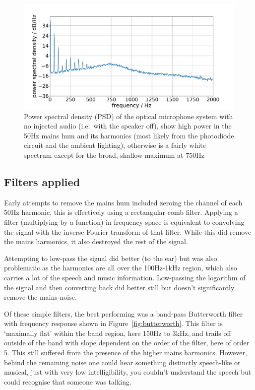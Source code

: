 \documentclass[prb,preprint]{revtex4-1}
\begin{document}
\begin{figure}%
	\includegraphics[width=\textwidth]{figures/podo_noise_psd_zoom-cropped.pdf}
	\caption{Power spectral density (PSD) of the optical microphone system with no injected audio (i.e.\ with the speaker off), show high power in the 50Hz mains hum and its harmonics (most likely from the photodiode circuit and the ambient lighting), otherwise is a fairly white spectrum except for the broad, shallow maximum at 750Hz}
	\label{fig:psd_noise}
\end{figure}

\subsection{Filters applied}

Early attempts to remove the mains hum included zeroing the channel of each 50Hz harmonic, this is effectively using a rectangular comb filter. Applying a filter (multiplying by a function) in frequency space is equivalent to convolving the signal with the inverse Fourier transform of that filter. While this did remove the mains harmonics, it also destroyed the rest of the signal.


Attempting to low-pass the signal did better (to the ear) but was also problematic as the harmonics are all over the 100Hz-1kHz region, which also carries a lot of the speech and music information. Low-passing the logarithm of the signal and then converting back did better still but doesn’t significantly remove the mains noise.


Of these simple filters, the best performing was a band-pass Butterworth filter with frequency response shown in Figure~\ref{fig:butterworth}. This filter is `maximally flat' within the band region, here 150Hz to 3kHz, and trails off outside of the band with slope dependent on the order of the filter, here of order 5. This still suffered from the presence of the higher mains harmonics. However, behind the remaining noise one could hear something distinctly speech-like or musical, just with very low intelligibility, you couldn’t understand the speech but could recognise that someone was talking.
\end{document}
